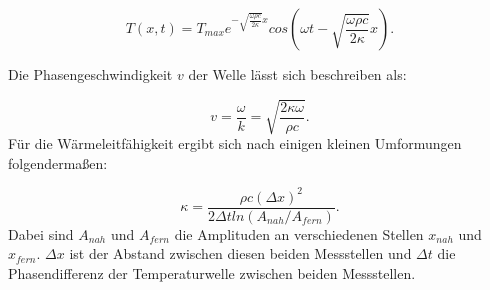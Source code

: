 \begin{equation}
    T(x,t) = T_{max} e^{-\sqrt{\frac{\omega \rho c}{2 \kappa}} x} cos(\omega t - \sqrt{\frac{\omega \rho c}{2 \kappa}} x).
    \label{eq:Wellengleichung}
\end{equation}

Die Phasengeschwindigkeit $v$ der Welle lässt sich beschreiben als:

\begin{equation}
    v= \frac{\omega}{k} = \sqrt{\frac{2\kappa \omega}{\rho c}}.
    \label{eq:phasengesch}
\end{equation}
Für die Wärmeleitfähigkeit ergibt sich nach einigen kleinen Umformungen folgendermaßen:

\begin{equation}
    \kappa = \frac{\rho c (\Delta x)^2}{2 \Delta t ln(A_{nah}/A_{fern})}.
    \label{eq:Wärme}
\end{equation}
Dabei sind $A_{nah}$ und $A_{fern}$ die Amplituden an verschiedenen Stellen $x_{nah}$ und $x_{fern}$. $\Delta x$ ist der Abstand zwischen diesen beiden Messstellen und $\Delta t$ die Phasendifferenz der Temperaturwelle zwischen beiden Messstellen. 
